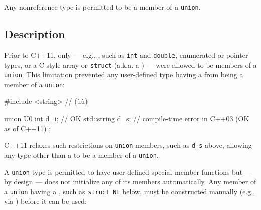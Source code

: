 




Any nonreference type is permitted to be a member of a \lstinline!union!.

\subsection[Description]{Description}\label{unrestrictedunion-description}

Prior to C++11, only  --- e.g.,
, such as \lstinline!int! and \lstinline!double!,
enumerated or pointer types, or a C-style array or \lstinline!struct!
(a.k.a. a ) --- were allowed to be members of a
\lstinline!union!. This limitation prevented any user-defined type having
a  from being a member of a
\lstinline!union!:

\begin{emcppshiddenlisting}[emcppsbatch=e1]
#include <string>  // (ù{}ù)
\end{emcppshiddenlisting}
\begin{emcppslisting}[emcppsbatch=e1]
union U0
{
    int         d_i;  // OK
    std::string d_s;  // compile-time error in C++03 (OK as of C++11)
};
\end{emcppslisting}

\noindent C++11 relaxes such restrictions on \lstinline!union! members, such as
\lstinline!d_s! above, allowing any type other than a  to be a member of a \lstinline!union!.

A \lstinline!union! type is permitted to have user-defined special member
functions but --- by design --- does not initialize any of its members
automatically. Any member of a \lstinline!union! having a
, such as \lstinline!struct!~\lstinline!Nt!
below, must be constructed manually (e.g., via ) before it can be used:

